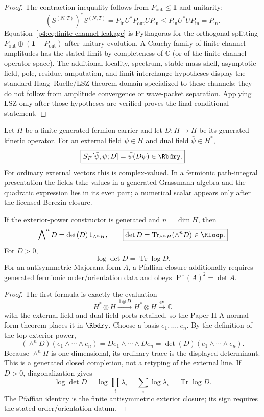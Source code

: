 \documentclass[12pt,a4paper]{article}
\begin{document}
\begin{proof}
The contraction inequality follows from \(P_{\mathrm{out}}\le\mathbf 1\) and unitarity:
\[
(S^{(N,T)})^*S^{(N,T)}=P_{\mathrm{in}}U^*P_{\mathrm{out}}UP_{\mathrm{in}}\le P_{\mathrm{in}}U^*UP_{\mathrm{in}}=P_{\mathrm{in}}.
\]
Equation~\eqref{p4:eq:finite-channel-leakage} is Pythagoras for the
orthogonal splitting
\(P_{\mathrm{out}}\oplus(\mathbf 1-P_{\mathrm{out}})\) after unitary
evolution.  A Cauchy family of finite channel amplitudes has the stated
limit by completeness of \(\mathbb C\) (or of the finite channel operator
space).  The additional locality, spectrum, stable-mass-shell,
asymptotic-field, pole, residue, amputation, and limit-interchange
hypotheses display the standard Haag--Ruelle/LSZ theorem domain specialized
to these channels; they do not follow from amplitude convergence or
wave-packet separation.  Applying
LSZ only after those hypotheses are verified proves the final conditional
statement.
\end{proof}

\begin{theorem}
\label{p4:thm:external-fermion-line-generated-closure}
Let \(H\) be a finite generated fermion carrier and let \(D:H\to H\) be its
generated kinetic operator.  For an external field
\(\psi\in H\) and dual field \(\bar\psi\in H^*\),
\[
 \boxed{S_F[\bar\psi,\psi;D]=\bar\psi(D\psi)\in\Rbdry.}
\]
For ordinary external vectors this is complex-valued.  In a fermionic
path-integral presentation the fields take values in a generated Grassmann
algebra and the quadratic expression lies in its even part; a numerical
scalar appears only after the licensed Berezin closure.

If the exterior-power constructor is generated and \(n=\dim H\), then
\[
 \bigwedge\nolimits^nD
 =\det(D)\,1_{\wedge^nH},
 \qquad
 \boxed{\det D
 =\operatorname{Tr}_{\wedge^nH}(\wedge^nD)\in\Rloop.}
\]
For \(D>0\),
\[
 \boxed{\log\det D=\operatorname{Tr}\log D.}
\]
For an antisymmetric Majorana form \(A\), a Pfaffian closure additionally
requires generated fermionic order/orientation data and obeys
\(\operatorname{Pf}(A)^2=\det A\).
\end{theorem}

\begin{proof}
The first formula is exactly the evaluation
\[
 H^*\otimes H\xrightarrow{\,1\otimes D\,}H^*\otimes H
 \xrightarrow{\operatorname{ev}}\mathbb C
\]
with the external field and dual-field ports retained, so the Paper-II-A
normal-form theorem places it in \(\Rbdry\).  Choose a basis
\(e_1,\ldots,e_n\).  By the definition of the top exterior power,
\[
 (\wedge^nD)(e_1\wedge\cdots\wedge e_n)
 =De_1\wedge\cdots\wedge De_n
 =\det(D)(e_1\wedge\cdots\wedge e_n).
\]
Because \(\wedge^nH\) is one-dimensional, its ordinary trace is the displayed
determinant.  This is a generated closed completion, not a retyping of the
external line.  If \(D>0\), diagonalization gives
\[
 \log\det D=\log\prod_i\lambda_i
 =\sum_i\log\lambda_i=\operatorname{Tr}\log D.
\]
The Pfaffian identity is the finite antisymmetric exterior closure; its sign
requires the stated order/orientation datum.
\end{proof}
\end{document}
